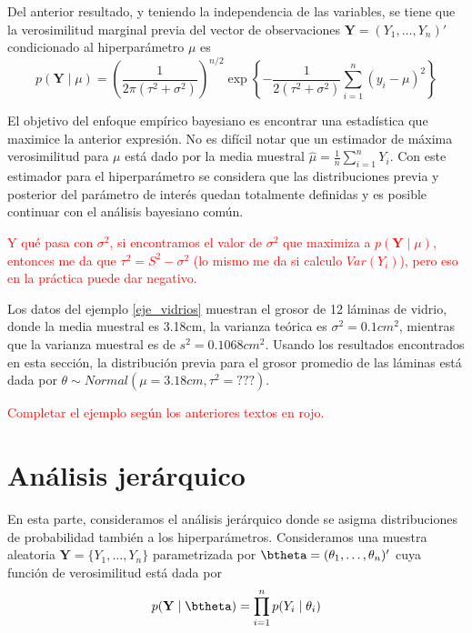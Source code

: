Del anterior resultado, y teniendo la independencia de las variables, se tiene que la verosimilitud marginal previa del vector de observaciones $\mathbf{Y}=(Y_1,\ldots,Y_n)'$ condicionado al hiperparámetro $\mu$ es
\begin{equation*}
p(\mathbf{Y} \mid \mu)=\left(\frac{1}{2\pi(\tau^2+\sigma^2)}\right)^{n/2}
\exp\left\{-\frac{1}{2(\tau^2+\sigma^2)}\sum_{i=1}^n\left(y_i-\mu\right)^2\right\}
\end{equation*}

El objetivo del enfoque empírico bayesiano es encontrar una estadística que maximice la anterior expresión. No es difícil notar que un estimador de máxima verosimilitud para $\mu$ está dado por la media muestral $\hat{\mu}=\frac{1}{n}\sum_{i=1}^n Y_i$. Con este estimador para el hiperparámetro se considera que las distribuciones previa y posterior del parámetro de interés quedan totalmente definidas y es posible continuar con el análisis bayesiano común.

\textcolor{red}{Y qué pasa con $\sigma^2$, si encontramos el valor de $\sigma^2$ que maximiza a $p(\mathbf{Y}\mid\mu)$, entonces me da que $\tau^2=S^2-\sigma^2$ (lo mismo me da si calculo $Var(Y_i)$), pero eso en la práctica puede dar negativo.}

\begin{Eje}
Los datos del ejemplo \ref{eje_vidrios} muestran el grosor de 12 láminas de vidrio, donde la media muestral es 3.18cm, la varianza teórica es $\sigma^2=0.1cm^2$, mientras que la varianza muestral es de $s^2=0.1068cm^2$. Usando los resultados encontrados en esta sección, la distribución previa para el grosor promedio de las láminas está dada por $\theta\sim Normal(\mu=3.18cm,\tau^2=???)$. 

\textcolor{red}{Completar el ejemplo según los anteriores textos en rojo.}
\end{Eje}

\section{Análisis jerárquico}
En esta parte, consideramos el análisis jerárquico donde se asigma distribuciones de probabilidad también a los hiperparámetros. Consideramos una muestra aleatoria $\mathbf{Y}=\{Y_1,\ldots,Y_n\}$ parametrizada por $\btheta=(\theta_1,\ldots,\theta_n)'$ cuya función de verosimilitud está dada por
\begin{equation}
p(\mathbf{Y} \mid \btheta)=\prod_{i=1}^n p(Y_i \mid \theta_i)
\end{equation}

